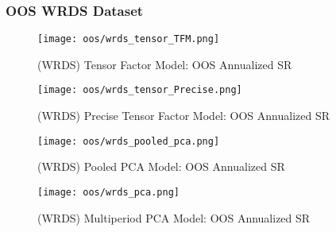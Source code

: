 \subsubsection{OOS WRDS Dataset}

\begin{figure}[H]
    \centering
    \texttt{[image: oos/wrds\_tensor\_TFM.png]}
    \caption{(WRDS) Tensor Factor Model: OOS Annualized SR}
    \label{fig:wrds-oos-tfm}
\end{figure}

\begin{figure}[H]
    \centering
    \texttt{[image: oos/wrds\_tensor\_Precise.png]}
    \caption{(WRDS) Precise Tensor Factor Model: OOS Annualized SR}
    \label{fig:wrds-oos-precise}
\end{figure}

\begin{figure}[H]
    \centering
    \texttt{[image: oos/wrds\_pooled\_pca.png]}
    \caption{(WRDS) Pooled PCA Model: OOS Annualized SR}
    \label{fig:wrds-oos-pooled-pca}
\end{figure}

\begin{figure}[H]
    \centering
    \texttt{[image: oos/wrds\_pca.png]}
    \caption{(WRDS) Multiperiod PCA Model: OOS Annualized SR}
    \label{fig:wrds-oos-pca}
\end{figure}
